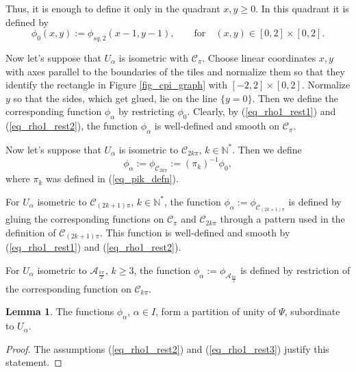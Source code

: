 \documentclass[12pt]{article}
\numberwithin{equation}{section}
\theoremstyle{theorem}
\theoremstyle{definition}
\newtheorem{lem}[thm]{Lemma}
\theoremstyle{remark}
\newcommand{\nat}{\mathbb{N}}
\begin{document}
	Thus, it is enough to define it only in the quadrant $x, y \geq 0$.
	In this quadrant it is defined by
	\begin{equation}
		\phi_{0}(x, y) := \phi_{sq, 2}(x - 1, y - 1), \qquad \text{for} \quad (x, y) \in [0, 2] \times [0, 2]. 
	\end{equation}
	\par Now let's suppose that $U_{\alpha}$ is isometric with $\mathcal{C}_{\pi}$.
	Choose linear coordinates $x, y$ with axes parallel to the boundaries of the tiles and normalize them so that they identify the rectangle in Figure \ref{fig_cpi_graph} with $[-2, 2] \times [0, 2]$.
	Normalize $y$ so that the sides, which get glued, lie on the line $\{ y = 0\}$.
	Then we define the corresponding function $\phi_{\alpha}$ by restricting $\phi_{0}$.
	Clearly, by (\ref{eq_rho1_rest1}) and (\ref{eq_rho1_rest2}), the function $\phi_{\alpha}$ is well-defined and smooth on $\mathcal{C}_{\pi}$.
	\par Now let's suppose that $U_{\alpha}$ is isometric to $\mathcal{C}_{2 k \pi}$, $k \in \nat^*$.
	Then we define 
	\begin{equation}
		\phi_{\alpha} := \phi_{\mathcal{C}_{2 k \pi}} := (\pi_k)^{-1} \phi_{0},
	\end{equation} 
	where $\pi_k$ was defined in (\ref{eq_pik_defn}).
	\par For $U_{\alpha}$ isometric to $\mathcal{C}_{(2 k + 1) \pi}$, $k \in \nat^*$, the function $\phi_{\alpha} := \phi_{\mathcal{C}_{(2 k + 1) \pi}}$ is defined by gluing the corresponding functions on $\mathcal{C}_{\pi}$ and $\mathcal{C}_{2 k \pi}$ through a pattern used in the definition of $\mathcal{C}_{(2 k + 1) \pi}$. 
	This function is well-defined and smooth by (\ref{eq_rho1_rest1}) and (\ref{eq_rho1_rest2}).
	\par For $U_{\alpha}$ isometric to $\mathcal{A}_{\frac{k \pi}{2}}$, $k \geq 3$, the function $\phi_{\alpha} := \phi_{\mathcal{A}_{\frac{k \pi}{2}}}$ is defined by restriction of the corresponding function on $\mathcal{C}_{k \pi}$.
	\begin{lem}
		The functions $\phi_{\alpha}$, $\alpha \in I$, form a partition of unity of $\Psi$, subordinate to $U_{\alpha}$.
	\end{lem}
	\begin{proof}
		The assumptions (\ref{eq_rho1_rest2}) and (\ref{eq_rho1_rest3}) justify this statement.
	\end{proof}
	
\end{document}
